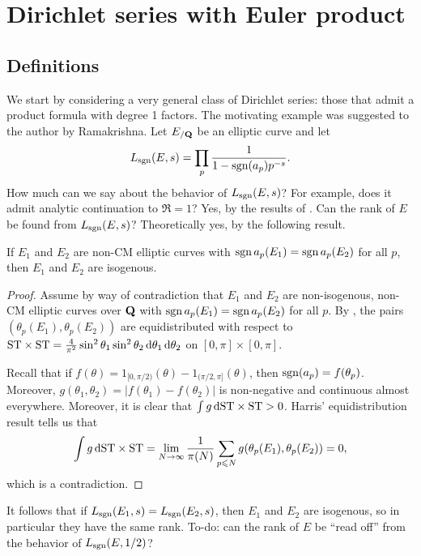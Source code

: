 
\chapter{Dirichlet series with Euler product}\label{ch:Dirichlet-series}





\section{Definitions}

We start by considering a very general class of Dirichlet series: those that 
admit a product formula with degree 1 factors. The motivating example was 
suggested to the author by Ramakrishna. Let $E_{/\mathbf{Q}}$ be an elliptic 
curve and let 
\[
	L_{\operatorname{sgn}}(E,s) = \prod_p \frac{1}{1-\operatorname{sgn}(a_p) p^{-s}} .
\]
How much can we say about the behavior of $L_{\operatorname{sgn}}(E,s)$? For example, does it 
admit analytic continuation to $\Re = 1$? Yes, by the results of 
\cite[A.2]{serre-1989}. Can the rank of $E$ be 
found from $L_{\operatorname{sgn}}(E,s)$? Theoretically yes, by the following result. 

\begin{theorem}
If $E_1$ and $E_2$ are non-CM elliptic curves with 
$\operatorname{sgn} a_p(E_1) = \operatorname{sgn} a_p(E_2)$ for all $p$, then $E_1$ and $E_2$ are 
isogenous.
\end{theorem}
\begin{proof}
Assume by way of contradiction that $E_1$ and $E_2$ are non-isogenous, non-CM 
elliptic curves over $\mathbf{Q}$ with $\operatorname{sgn} a_p(E_1) = \operatorname{sgn} a_p(E_2)$ for all $p$. By 
\cite[5.4]{harris-2009}, the pairs $(\theta_p(E_1),\theta_p(E_2))$ are 
equidistributed with respect to 
$\mathrm{ST}\times \mathrm{ST} = \frac{4}{\pi^2} \sin^2\theta_1\sin^2\theta_2\, \mathrm{d}\theta_1\, \mathrm{d}\theta_2$ 
on $[0,\pi]\times [0,\pi]$. 

Recall that if $f(\theta) = 1_{[0,\pi/2)}(\theta) - 1_{(\pi/2,\pi]}(\theta)$, 
then $\operatorname{sgn}(a_p) = f(\theta_p)$. Moreover, 
$g(\theta_1,\theta_2) = |f(\theta_1) - f(\theta_2)|$ is non-negative and 
continuous almost everywhere. Moreover, it is clear that 
$\int g\, \mathrm{d} \mathrm{ST}\times \mathrm{ST} > 0$. Harris' equidistribution result tells us that 
\[
	\int g\, \mathrm{d} \mathrm{ST}\times\mathrm{ST} = \lim_{N\to \infty} \frac{1}{\pi(N)} \sum_{p\leqslant N} g(\theta_p(E_1),\theta_p(E_2)) = 0 ,
\]
which is a contradiction. 
\end{proof}

It follows that if $L_{\operatorname{sgn}}(E_1,s) = L_{\operatorname{sgn}}(E_2,s)$, then $E_1$ and $E_2$ 
are isogenous, so in particular they have the same rank. To-do: can the rank of 
$E$ be ``read off'' from the behavior of $L_{\operatorname{sgn}}(E,1/2)$?



